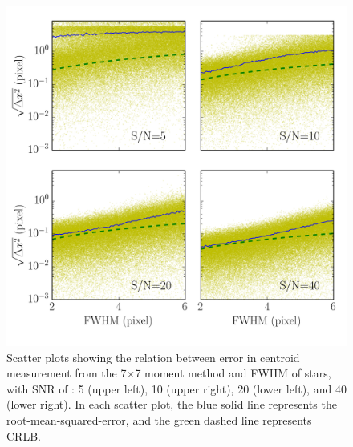 \documentclass[12pt, preprint]{aastex}
\begin{document}
\begin{figure}[!htb]
  \includegraphics[width=\linewidth]{fwhm_moment.png}
\endminipage
\caption{Scatter plots showing the relation between error in centroid measurement
from the 7$\times$7 moment method and FWHM of stars, with SNR of : 5 (upper left),
10 (upper right), 20 (lower left), and 40 (lower right). In each scatter plot, 
the blue solid
 line represents the root-mean-squared-error, and the green dashed line represents CRLB.}\label{8}
\end{figure}
\end{document}
